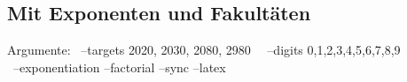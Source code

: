 \documentclass{article}
\theoremstyle{nonumberplain}
\newcommand{\nldelims}[1]{\right.#1\left.}
\newcommand{\mnl}{\nldelims{\newline}}
\begin{document}
\subsection{Mit Exponenten und Fakultäten}

Argumente:
~--targets 2020, 2030, 2080, 2980~
~--digits 0,1,2,3,4,5,6,7,8,9~\\
~--exponentiation --factorial --sync --latex~

\end{document}
